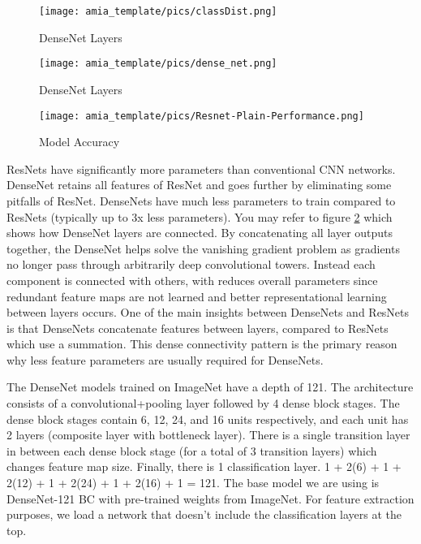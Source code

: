 \documentclass{amia}
\begin{document}
\begin{figure}[h!]
\centering
\texttt{[image: amia\_template/pics/classDist.png]}
\caption{DenseNet Layers}
\label{figd}
\end{figure}

\begin{figure}[h!]
\centering
\texttt{[image: amia\_template/pics/dense\_net.png]}
\caption{DenseNet Layers}
\label{figx}
\end{figure}

\begin{figure}[h!]
\centering
\texttt{[image: amia\_template/pics/Resnet-Plain-Performance.png]}
\caption{Model Accuracy}
\label{fig3}
\end{figure}

ResNets have significantly more parameters than conventional CNN networks. DenseNet retains all features of ResNet and goes further by eliminating some pitfalls of ResNet. DenseNets have much less parameters to train compared to ResNets (typically up to 3x less parameters). You may refer to figure \ref{figx} which shows how DenseNet layers are connected. By concatenating all layer outputs together, the DenseNet helps solve the vanishing gradient problem as gradients no longer pass through arbitrarily deep convolutional towers. Instead each component is connected with others, with reduces overall parameters since redundant feature maps are not learned and better representational learning between layers occurs. One of the main insights between DenseNets and ResNets is that DenseNets concatenate features between layers, compared to ResNets which use a summation. This dense connectivity pattern is the primary reason why less feature parameters are usually required for DenseNets.

The DenseNet models trained on ImageNet have a depth of 121. The architecture consists of a convolutional+pooling layer followed by 4 dense block stages. The dense block stages contain 6, 12, 24, and 16 units respectively, and each unit has 2 layers (composite layer with bottleneck layer). There is a single transition layer in between each dense block stage (for a total of 3 transition layers) which changes feature map size. Finally, there is 1 classification layer. 1 + 2(6) + 1 + 2(12) + 1 + 2(24) + 1 + 2(16) + 1 = 121. The base model we are using is DenseNet-121 BC with pre-trained weights from ImageNet. For feature extraction purposes, we load a network that doesn't include the classification layers at the top.
\end{document}
